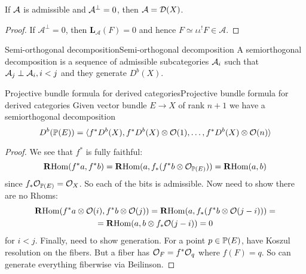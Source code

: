 \begin{corollary}{}{}
    If $\calA$ is admissible and $\calA^\perp=0$, then $\calA=\calD(X)$.
\end{corollary}
\begin{proof}[Proof]
    If $\mathcal{A}^\perp=0$, then $\mathbf{L}_\mathcal{A}(F)=0$ and hence $F\simeq \iota \iota^! F\in \mathcal{A}$.
\end{proof}



\begin{definition}{Semi-orthogonal decomposition}{Semi-orthogonal decomposition}
    A semiorthogonal decomposition is a sequence of admissible subcategories $\calA_{i}$ such that $\calA_{j}\perp \calA_{i}, i<j$ and they generate $D^b(X)$.
\end{definition}


\begin{proposition}{Projective bundle formula for derived categories}{Projective bundle formula for derived categories}
    Given vector bundle $E\rightarrow X$ of rank $n+1$ we have a semiorthogonal decomposition $$D^b(\P(E))=\langle f^*D^b(X), f^*D^b(X)\otimes \O(1),\dots, f^*D^b(X)\otimes \O(n)\rangle$$
\end{proposition}

\begin{proof}
    We see that $f^*$ is fully faithful: $$\RHom(f^*a,f^*b)=\RHom(a, f_{*} (f^*b\otimes \O_{\P(E)}))=\RHom(a, b)$$since $f_*\O_{\P(E)}=\O_{X}$. So each of the bits is admissible. Now need to show there are no Rhoms: $$\begin{gathered}
\RHom(f^*a\otimes \O(i), f^*b\otimes \O(j))=\RHom(a, f_{*}(f^*b\otimes \O(j-i)))=\\
=\RHom(a, b\otimes f_{*}\O(j-i))=0
\end{gathered}$$for $i<j$. Finally, need to show generation. For a point $p\in \P(E)$, have Koszul resolution on the fibers. But a fiber has $\O_{F}=f^*\O_{q}$ where $f(F)=q$. So can generate everything fiberwise via Beilinson.
\end{proof}

